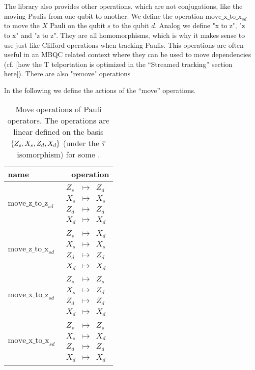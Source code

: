 \documentclass[a4paper,english]{scrartcl}
\begin{document}
The library also provides other operations, which are not conjugations, like the moving
Paulis from one qubit to another. We define the operation $\mathrm{move\_x\_to\_x}_{sd}$
to move the $X$ Pauli on the qubit $s$ to the qubit $d$. Analog we define "x to z", "z
to x" and "z to z". They are all homomorphisms, which is why it makes sense to use just
like Clifford operations when tracking Paulis. This operations are often useful in an
MBQC related context where they can be used to move dependencies (cf.
[how the T
telportation is optimized in the ``Streamed tracking'' section here]). There are also
"remove" operations
\begin{definition}
In the following we define the actions of the ``move'' operations.
\begin{table}[H]
\center
\caption[Move operations of Pauli operators]{Move operations of Pauli operators. The
operations are linear defined on the basis $\bc{Z_s, X_s, Z_d, X_d}$ (under the $\overline{\tau}$
isomorphism) for some \en[s, d].}
\begin{tabular}{lr}
  \toprule
  name & operation\\
  \midrule
  $\mathrm{move\_z\_to\_z}_{sd}$ & $\begin{array}{ccc}
    Z_s&\mapsto&Z_d\\X_s&\mapsto&X_s\\Z_d&\mapsto&Z_d\\X_d&\mapsto&X_d\end{array}$\\
  \midrule
  $\mathrm{move\_z\_to\_x}_{sd}$ & $\begin{array}{ccc}
    Z_s&\mapsto&X_d\\X_s&\mapsto&X_s\\Z_d&\mapsto&Z_d\\X_d&\mapsto&X_d\end{array}$\\
  \midrule
  $\mathrm{move\_x\_to\_z}_{sd}$ & $\begin{array}{ccc}
    Z_s&\mapsto&Z_s\\X_s&\mapsto&Z_d\\Z_d&\mapsto&Z_d\\X_d&\mapsto&X_d\end{array}$\\
  \midrule
  $\mathrm{move\_x\_to\_x}_{sd}$ & $\begin{array}{ccc}
    Z_s&\mapsto&Z_s\\X_s&\mapsto&X_d\\Z_d&\mapsto&Z_d\\X_d&\mapsto&X_d\end{array}$\\
  \bottomrule
\end{tabular}
\end{table}
\end{definition}
\end{document}
